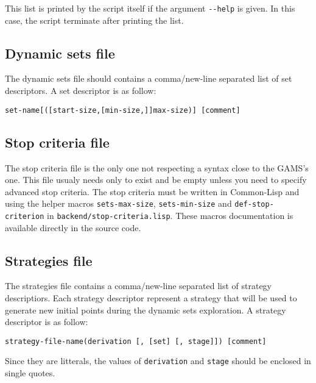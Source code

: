 This list is printed by the script itself if the argument \texttt{-{}-help} is
given. In this case, the script terminate after printing the list.

\subsection*{Dynamic sets file}

The dynamic sets file should contains a comma/new-line separated list of set descriptors.
A set descriptor is as follow:
\begin{center}
  \texttt{set-name[([start-size,[min-size,]]max-size)] [comment]}
\end{center}

\subsection*{Stop criteria file}

The stop criteria file is the only one not respecting a syntax close to the
GAMS's one. This file usualy needs only to exist and be empty unless you need to
specify advanced stop criteria. The stop criteria must be written in Common-Lisp
and using the helper macros \texttt{sets-max-size}, \texttt{sets-min-size} and
\texttt{def-stop-criterion} in \texttt{backend/stop-criteria.lisp}. These macros
documentation is available directly in the source code.

\subsection*{Strategies file}

The strategies file contains a comma/new-line separated list of strategy
descriptiors. Each strategy descriptor represent a strategy that will be used
to generate new initial points during the dynamic sets exploration.
A strategy descriptor is as follow:
\begin{center}
  \texttt{strategy-file-name(derivation [, [set] [, stage]]) [comment]}
\end{center}
Since they are litterals, the values of \texttt{derivation} and \texttt{stage}
should be enclosed in single quotes.

